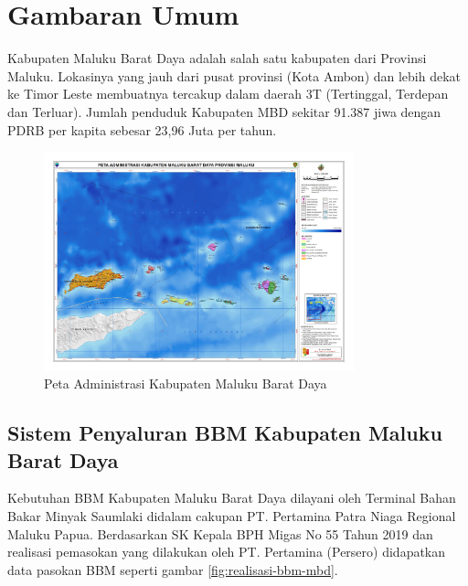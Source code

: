 \section{Gambaran Umum}
\label{sec:gambaran-umum}

Kabupaten Maluku Barat Daya adalah salah satu kabupaten dari Provinsi Maluku. Lokasinya yang jauh dari pusat provinsi (Kota Ambon) dan lebih dekat ke Timor Leste membuatnya tercakup dalam daerah 3T (Tertinggal, Terdepan dan Terluar). Jumlah penduduk Kabupaten MBD sekitar 91.387 jiwa dengan PDRB per kapita sebesar 23,96 Juta per tahun.

\begin{figure}[ht!]
    \centering
    \includegraphics[width=0.8\textwidth]{gambar/administrasi-maluku-barat-daya-a1.jpg}
    \caption{Peta Administrasi Kabupaten Maluku Barat Daya \citep{Peta_Tematik_Indonesia_2014}}
    \label{fig:peta-mbd-basic}
\end{figure}

\subsection{Sistem Penyaluran BBM Kabupaten Maluku Barat Daya}
\label{subsec:sistem-eksisting}

    Kebutuhan BBM Kabupaten Maluku Barat Daya dilayani oleh Terminal Bahan Bakar Minyak Saumlaki didalam cakupan PT. Pertamina Patra Niaga Regional Maluku Papua. Berdasarkan SK Kepala BPH Migas No 55 Tahun 2019 dan realisasi pemasokan yang dilakukan oleh PT. Pertamina (Persero) didapatkan data pasokan BBM seperti gambar \ref{fig:realisasi-bbm-mbd}.

